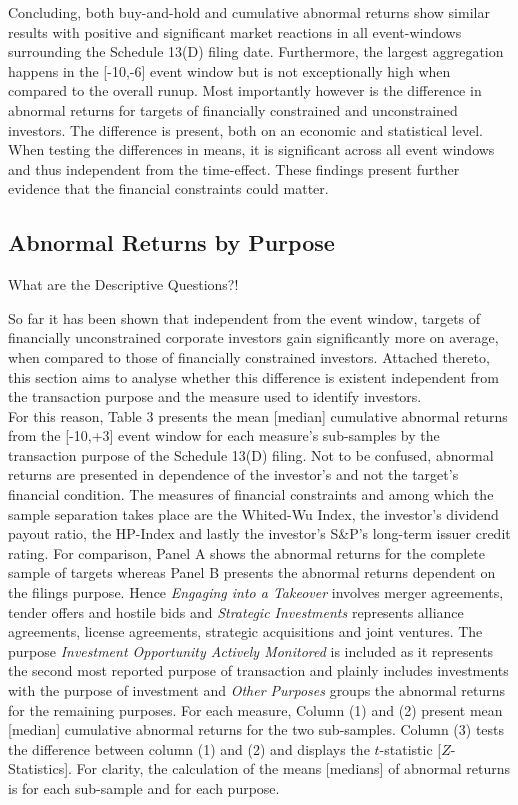 \documentclass[12pt]{article}
\begin{document}
Concluding, both buy-and-hold and cumulative abnormal returns show similar results with positive and significant market reactions in all event-windows surrounding the Schedule 13(D) filing date. Furthermore, the largest aggregation happens in the [-10,-6] event window but is not exceptionally high when compared to the overall runup. Most importantly however is the difference in abnormal returns for targets of financially constrained and unconstrained investors. The difference is present, both on an economic and statistical level. When testing the differences in means, it is significant across all event windows and thus independent from the time-effect. These findings present further evidence that the financial constraints could matter. 
\pagebreak

\subsection{Abnormal Returns by Purpose}
What are the Descriptive Questions?! 

So far it has been shown that independent from the event window, targets of financially unconstrained corporate investors gain significantly more on average, when compared to those of financially constrained investors. Attached thereto, this section aims to analyse whether this difference is existent independent from the transaction purpose and the measure used to identify investors.\\
For this reason, Table 3 presents the mean [median] cumulative abnormal returns from the [-10,+3] event window for each measure's sub-samples by the transaction purpose of the Schedule 13(D) filing. Not to be confused, abnormal returns are presented in dependence of the investor's and not the target's financial condition. The measures of financial constraints and among which the sample separation takes place are the Whited-Wu Index, the investor's dividend payout ratio, the HP-Index and lastly the investor's  S\&P's long-term issuer credit rating. For comparison, Panel A shows the abnormal returns for the complete sample of targets whereas Panel B presents the abnormal returns dependent on the filings purpose. Hence \emph{Engaging into a Takeover} involves merger agreements, tender offers and hostile bids and \emph{Strategic Investments} represents alliance agreements, license agreements, strategic acquisitions and joint ventures. The purpose \emph{Investment Opportunity Actively Monitored} is included as it represents the second most reported purpose of transaction and plainly includes investments with the purpose of investment and  \emph{Other Purposes} groups the abnormal returns for the remaining purposes. For each measure, Column (1) and (2) present mean [median] cumulative abnormal returns for the two sub-samples. Column (3) tests the difference between column (1) and (2) and displays the  $t$-statistic [$Z$-Statistics]. For clarity, the calculation of the means [medians] of abnormal returns is for each sub-sample and for each purpose.
\end{document}

